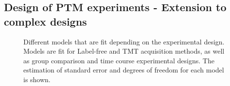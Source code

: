 \documentclass{mcp}
\begin{document}

\subsection{Design of PTM experiments - Extension to complex designs}
\label{sec:complex_design}


\begin{figure}[h!]
%
\caption{Different models that are fit depending on the experimental design. Models are fit for Label-free and TMT acquisition methods, as well as group comparison and time course experimental designs. The estimation of standard error and degrees of freedom for each model is shown. \label{fig:statistical_inference}}
\end{figure}
\end{document}
